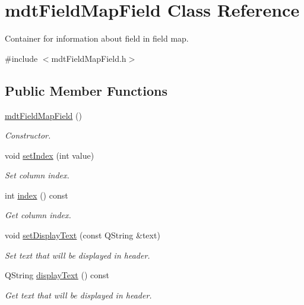 \hypertarget{classmdt_field_map_field}{\section{mdt\-Field\-Map\-Field Class Reference}
\label{classmdt_field_map_field}
}


Container for information about field in field map.  




{\ttfamily \#include $<$mdt\-Field\-Map\-Field.\-h$>$}

\subsection*{Public Member Functions}
\begin{DoxyCompactItemize}
\item 
\hyperlink{classmdt_field_map_field_af2ba29d63e03cea7c71f3f6367133b33}{mdt\-Field\-Map\-Field} ()
\begin{DoxyCompactList}\small\item\em Constructor. \end{DoxyCompactList}\item 
void \hyperlink{classmdt_field_map_field_a7cb5833082c2b7d531b1f67db2dc0060}{set\-Index} (int value)
\begin{DoxyCompactList}\small\item\em Set column index. \end{DoxyCompactList}\item 
int \hyperlink{classmdt_field_map_field_a73bef09966745b3192abfa93ed83b51b}{index} () const 
\begin{DoxyCompactList}\small\item\em Get column index. \end{DoxyCompactList}\item 
void \hyperlink{classmdt_field_map_field_ae5aa003e043f4ebec34f5670e1640eb6}{set\-Display\-Text} (const Q\-String \&text)
\begin{DoxyCompactList}\small\item\em Set text that will be displayed in header. \end{DoxyCompactList}\item 
Q\-String \hyperlink{classmdt_field_map_field_a3ee55b810bd6127bb88a32a7c753b1e7}{display\-Text} () const 
\begin{DoxyCompactList}\small\item\em Get text that will be displayed in header. \end{DoxyCompactList}\item 

\end{DoxyCompactItemize}
